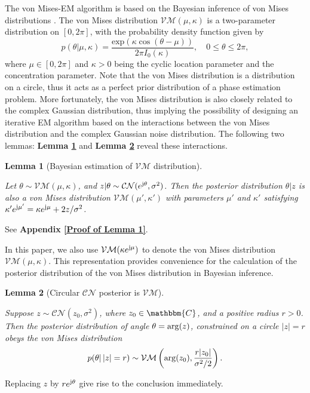 \documentclass[journal,twocolumn]{IEEEtran}
\newtheorem{lemma}{\bf Lemma}
\theoremstyle{nonumberplain}
\def \exp {\text{exp}}
\def \CN {\mathcal{CN}}
\def \VM {\mathcal{VM}}
\begin{document}
    The von Mises-EM algorithm is based on the Bayesian inference of von Mises distributions \cite{mardia1976bayesian}. The von Mises distribution $\VM(\mu, \kappa)$ is a two-parameter distribution on $[0, 2\pi]$, with the probability density function given by 
    \begin{equation}
        p(\theta|\mu, \kappa) = \frac{\exp(\kappa \cos(\theta - \mu))}{2\pi I_0(\kappa)}, \quad 0\leq \theta \leq 2\pi,
    \end{equation}
    where $\mu \in [0,2\pi]$ and $\kappa >0$ being the cyclic location parameter and the concentration parameter. 
    Note that the von Mises distribution is a distribution on a circle, thus it acts as a perfect prior distribution of a phase estimation problem. 
    More fortunately, the von Mises distribution is also closely related to the complex Gaussian distribution, thus implying the possibility of designing an iterative EM algorithm \cite{casella2021statistical} based on the interactions between the von Mises distribution and the complex Gaussian noise distribution. The following two lemmas: {\bf Lemma \ref{lemma_1}} and {\bf Lemma \ref{lemma_2}} reveal these interactions. 
    \begin{lemma}[Bayesian estimation of $\VM$ distribution]\label{lemma_1} \mbox{}\par
        Let $\theta \sim \VM(\mu, \kappa)$, and $z|\theta \sim \CN(e^{{\rm j}\theta}, \sigma^2)$. Then the posterior distribution $\theta | z$ is also a von Mises distribution $\VM(\mu', \kappa')$ with parameters $\mu'$ and $\kappa'$ satisfying $\kappa' e^{{\rm j}\mu'} = \kappa e^{{\rm j}\mu} + 2z/\sigma^2$.
    \end{lemma}
        \begin{IEEEproof}
        See {\bf Appendix \ref{Proof of Lemma 1}}. 
    \end{IEEEproof}
    
    In this paper, we also use $\VM(\kappa e^{{\rm j}\mu})$ to denote the von Mises distribution $\VM(\mu, \kappa)$. 
    This representation provides convenience for the calculation of the posterior distribution of the von Mises distribution in Bayesian inference.

    \begin{lemma}[Circular $\CN$ posterior is $\VM$]\label{lemma_2} \mbox{}\par
        Suppose $z \sim \CN(z_0, \sigma^2)$, where $z_0 \in \mathbbm{C}$, and a positive radius $r>0$. Then the posterior distribution of angle $\theta= {\rm arg} (z)$, constrained on a circle $|z|=r$ obeys the von Mises distribution
        \begin{equation}
            p(\theta |\, |z|=r) \sim \VM\left({\rm arg}(z_0), \frac{r|z_0|}{\sigma^2/2}\right).
        \end{equation}
    \end{lemma}
    \begin{IEEEproof}
        Replacing $z$ by $r e^{{\rm j} \theta}$ give rise to the conclusion immediately. 
    \end{IEEEproof}
    
\end{document}
